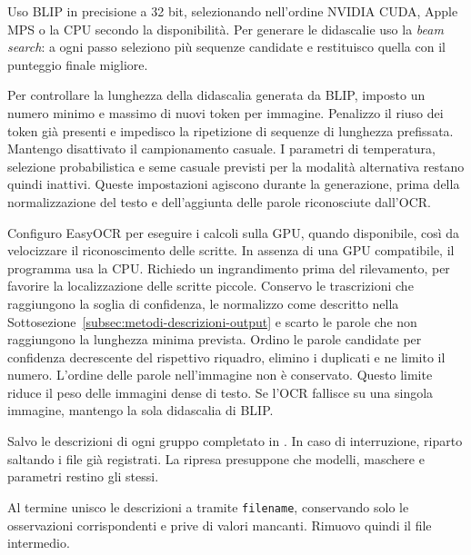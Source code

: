 Uso BLIP in precisione a 32 bit, selezionando nell'ordine NVIDIA CUDA, Apple MPS o la CPU secondo la disponibilità. Per generare le didascalie uso la \emph{beam search}: a ogni passo seleziono più sequenze candidate e restituisco quella con il punteggio finale migliore.

Per controllare la lunghezza della didascalia generata da BLIP, imposto un numero minimo e massimo di nuovi token per immagine. Penalizzo il riuso dei token già presenti e impedisco la ripetizione di sequenze di lunghezza prefissata. Mantengo disattivato il campionamento casuale. I parametri di temperatura, selezione probabilistica e seme casuale previsti per la modalità alternativa restano quindi inattivi. Queste impostazioni agiscono durante la generazione, prima della normalizzazione del testo e dell'aggiunta delle parole riconosciute dall'OCR.

Configuro EasyOCR per eseguire i calcoli sulla GPU, quando disponibile, così da velocizzare il riconoscimento delle scritte. In assenza di una GPU compatibile, il programma usa la CPU. Richiedo un ingrandimento prima del rilevamento, per favorire la localizzazione delle scritte piccole. Conservo le trascrizioni che raggiungono la soglia di confidenza, le normalizzo come descritto nella Sottosezione~\ref{subsec:metodi-descrizioni-output} e scarto le parole che non raggiungono la lunghezza minima prevista. Ordino le parole candidate per confidenza decrescente del rispettivo riquadro, elimino i duplicati e ne limito il numero. L'ordine delle parole nell'immagine non è conservato. Questo limite riduce il peso delle immagini dense di testo. Se l'OCR fallisce su una singola immagine, mantengo la sola didascalia di BLIP.

Salvo le descrizioni di ogni gruppo completato in . In caso di interruzione, riparto saltando i file già registrati. La ripresa presuppone che modelli, maschere e parametri restino gli stessi.

Al termine unisco le descrizioni a  tramite \texttt{filename}, conservando solo le osservazioni corrispondenti e prive di valori mancanti. Rimuovo quindi il file intermedio.

